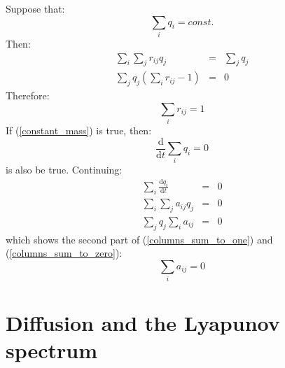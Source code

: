 \documentclass{article}
\begin{document}
\label{mass_conservation_derivation}

Suppose that:
\begin{equation}
	\sum_i q_i = const.
	\label{constant_mass}
\end{equation}
Then:
\begin{eqnarray}
	\sum_i \sum_j r_{ij} q_j & = & \sum_j q_j \\
	\sum_j q_j \left ( \sum_i r_{ij} - 1 \right ) & = & 0
\end{eqnarray}
Therefore:
\begin{equation}
	\sum_i r_{ij} = 1
\end{equation}
If (\ref{constant_mass}) is true, then:
\begin{equation}
	\frac{\mathrm d}{\mathrm d t}\sum_i q_i = 0
\end{equation}
is also be true. Continuing:
\begin{eqnarray}
	\sum_i \frac{\mathrm d q_i}{\mathrm d t} & = & 0 \\
\sum_i \sum_j a_{ij} q_j & = & 0 \\
\sum_j q_j \sum_i a_{ij} & = & 0
\end{eqnarray}
which shows the second part of (\ref{columns_sum_to_one}) and 
(\ref{columns_sum_to_zero}):
\begin{equation}
	\sum_i a_{ij} = 0
\end{equation}

\section{Diffusion and the Lyapunov spectrum}

\label{Lyapunov_exponents_less_than_zero}
\end{document}
